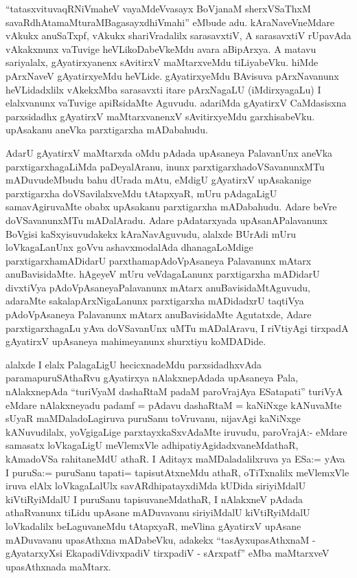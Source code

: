 
\begin{artha}
``tatasxvituvaqRNiVmaheV vayaMdeVvasayx BoVjanaM sherxVSaThxM savaRdhAtamaMturaMBagasayxdhiVmahi'' eMbude adu. kAraNaveVneMdare vAkukx anuSaTxpf, vAkukx shariVradalilx sarasavxtiV, A sarasavxtiV rUpavAda vAkakxnunx vaTuvige heVLikoDabeVkeMdu avara aBipArxya. A matavu sariyalalx, gAyatirxyanenx sAvitirxV maMtarxveMdu tiLiyabeVku. hiMde pArxNaveV gAyatirxyeMdu heVLide. gAyatirxyeMdu BAvisuva pArxNavanunx heVLidadxlilx vAkekxMba sarasavxti itare pArxNagaLU (iMdirxyagaLu) I elalxvanunx vaTuvige apiRsidaMte Aguvudu. adariMda gAyatirxV CaMdasisxna parxsidadhx gAyatirxV maMtarxvanenxV sAvitirxyeMdu garxhisabeVku. upAsakanu aneVka parxtigarxha mADabahudu. 

AdarU gAyatirxV maMtarxda oMdu pAdada upAsaneya PalavanUnx aneVka parxtigarxhagaLiMda paDeyalAranu, inunx parxtigarxhadoVSavanunxMTu mADuvudeMbudu bahu dUrada mAtu, eMdigU gAyatirxV upAsakanige parxtigarxha doVSavilalxveMdu tAtapxyaR, mUru pAdagaLigU samavAgiruvaMte obabx upAsakanu parxtigarxha mADabahudu. Adare beVre doVSavanunxMTu mADalAradu. Adare pAdatarxyada upAsanAPalavanunx BoVgisi kaSxyisuvudakekx kAraNavAguvudu, alalxde BUrAdi mUru loVkagaLanUnx goVvu ashavxmodalAda dhanagaLoMdige parxtigarxhamADidarU parxthamapAdoV\-\break pAsaneya Palavanunx mAtarx anuBavisidaMte. hAgeyeV mUru veVdagaLanunx parxtigarxha mADidarU divxtiVya pAdoVpAsaneya\break Palavanunx mAtarx anuBavisidaMtAguvudu, adaraMte sakalapArxNigaLanunx parxtigarxha mADidadxrU taqtiVya pAdoVpAsaneya Palavanunx mAtarx anuBavisidaMte Agutatxde, Adare parxtigarxhagaLu yAva doVSavanUnx uMTu mADalAravu, I riVtiyAgi tirxpadA gAyatirxV upAsaneya mahimeyanunx shurxtiyu koMDADide. 

alalxde I elalx PalagaLigU hecicxnadeMdu parxsidadhxvAda paramapuruSAthaRvu gAyatirxya nAlakxnepAdada upAsaneya Pala, nAlakxnepAda ``turiVyaM dashaRtaM padaM paroVrajAya ESatapati'' turiVyA eMdare nAlakxneyadu padamf = pAdavu dashaRtaM = kaNiNxge kANuvaMte sUyaR maMDaladoLagiruva puruSanu toVruvanu, nijavAgi kaNiNxge kANuvudilalx, yoVgigaLige parxtayxkaSxvAdaMte iruvudu, paroVrajA:- eMdare samasatx loVkagaLigU meVlemxVle adhipatiyAgidadxvaneMdathaR, kAmadoVSa rahitaneMdU athaR. I Aditayx maMDaladalilxruva ya ESa:= yAva I puruSa:= puruSanu tapati= tapisutAtxneMdu athaR, oTiTxnalilx meVlemxVle iruva elAlx loVkagaLalUlx savARdhipatayxdiMda kUDida siriyiMdalU kiVtiRyiMdalU I puruSanu tapisuvaneMdathaR, I nAlakxneV pAdada athaRvanunx tiLidu upAsane mADuvavanu siriyiMdalU kiVtiRyiMdalU loVkadalilx beLaguvaneMdu tAtapxyaR, meVlina gAyatirxV upAsane mADuvavanu upasAthxna mADabeVku, adakekx ``tasAyxupasAthxnaM - gAyatarxyXsi EkapadiVdivxpadiV tirxpadiV - sArxpatf'' eMba maMtarxveV upasAthxnada maMtarx. 


\end{artha}
